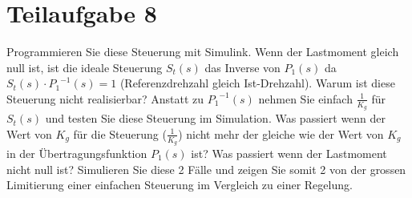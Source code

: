 \section{Teilaufgabe 8}
\begin{aufgabe}
Programmieren Sie diese Steuerung mit Simulink. Wenn der Lastmoment gleich 
null ist, ist die ideale Steuerung $S_t(s)$ das Inverse von $P_1(s)$ da 
$S_t(s) \cdot {P_1}^{-1}(s) = 1$ (Referenzdrehzahl gleich Ist-Drehzahl). Warum 
ist diese Steuerung nicht realisierbar? Anstatt zu ${P_1}^{-1}(s)$ nehmen Sie 
einfach $\frac{1}{K_g}$ für $S_t(s)$ und testen Sie diese Steuerung im 
Simulation.  Was passiert wenn der Wert von $K_g$ für die Steuerung 
($\frac{1}{K_g}$) nicht mehr der gleiche wie der Wert von $K_g$ in der 
Übertragungsfunktion $P_1(s)$ ist? Was passiert wenn der Lastmoment nicht null 
ist? Simulieren Sie diese 2 Fälle und zeigen Sie somit 2 von der grossen 
Limitierung einer einfachen Steuerung im Vergleich zu einer Regelung.
\end{aufgabe}
